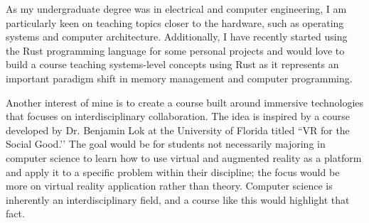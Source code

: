 As my undergraduate degree was in electrical and computer engineering, I am particularly keen on teaching topics closer to the hardware, such as operating systems and computer architecture. Additionally, I have recently started using the Rust programming language for some personal projects and would love to build a course teaching systems-level concepts using Rust as it represents an important paradigm shift in memory management and computer programming.

Another interest of mine is to create a course built around immersive technologies that focuses on interdisciplinary collaboration. The idea is inspired by a course developed by Dr. Benjamin Lok at the University of Florida titled ``VR for the Social Good.’’ The goal would be for students not necessarily majoring in computer science to learn how to use virtual and augmented reality as a platform and apply it to a specific problem within their discipline; the focus would be more on virtual reality application rather than theory. Computer science is inherently an interdisciplinary field, and a course like this would highlight that fact.

\label{teaching_last}
